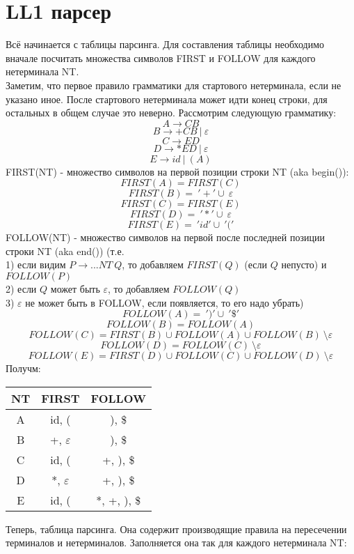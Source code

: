 \documentclass{article}
\begin{document}
\part{LL1 парсер}
Всё начинается с таблицы парсинга. Для составления таблицы необходимо вначале 
посчитать множества символов FIRST и FOLLOW для каждого нетерминала NT. 
\\Заметим, что первое правило грамматики для стартового нетерминала, 
если не указано иное. После стартового нетерминала может 
идти конец строки, для остальных в общем случае это неверно.
Рассмотрим следующую грамматику:
$$A \to CB $$
$$B \to +CB \ | \ \varepsilon $$
$$C \to ED $$
$$D \to *ED \ | \ \varepsilon$$
$$E \to id \ | \ (A)$$
FIRST(NT) - множество символов на первой позиции строки NT (aka begin()):\\
$$FIRST(A)=FIRST(C)$$
$$FIRST(B)=\ '+' \cup \ \varepsilon$$
$$FIRST(C)=FIRST(E)$$
$$FIRST(D)=\ '*' \cup \ \varepsilon$$
$$FIRST(E)=\ 'id' \cup \ '('$$
FOLLOW(NT) - множество символов на первой после последней
позиции строки NT (aka end()) (т.е.  \\ 
1) если видим $P \to ... NT \ Q$, то 
добавляем $FIRST(Q)$ (если $Q$ непусто) и $FOLLOW(P)$ \\
2) если $Q$ может быть $\varepsilon$, то добавляем $FOLLOW(Q)$ \\
3) $\varepsilon$ не может быть в FOLLOW, если появляется, то его надо убрать)
$$FOLLOW(A)=\ ')' \cup \ '\$' $$
$$FOLLOW(B)=FOLLOW(A)$$
$$FOLLOW(C)=FIRST(B) \cup FOLLOW(A) \cup FOLLOW(B)\ \setminus \varepsilon$$
$$FOLLOW(D)=FOLLOW(C) \ \setminus \varepsilon$$
$$FOLLOW(E)=FIRST(D) \cup FOLLOW(C) \cup FOLLOW(D)\ \setminus \varepsilon$$
Получм:\\
\begin{center}
  \begin{tabular}{ c|c|c }
    NT & FIRST & FOLLOW         \\
    \hline
    A &  id, ( & ), \$          \\
    \hline
    B &  +, $\varepsilon$ & ), \$    \\
    \hline
    C &  id, ( & +, ), \$       \\
    \hline
    D &  *, $\varepsilon$ & +, ), \$ \\
    \hline
    E &  id, ( & *, +, ), \$ 
  \end{tabular}
\end{center}
Теперь, таблица парсинга. Она содержит производящие правила на пересечении 
терминалов и нетерминалов. Заполняется
она так для каждого нетерминала NT:\\
\end{document}

